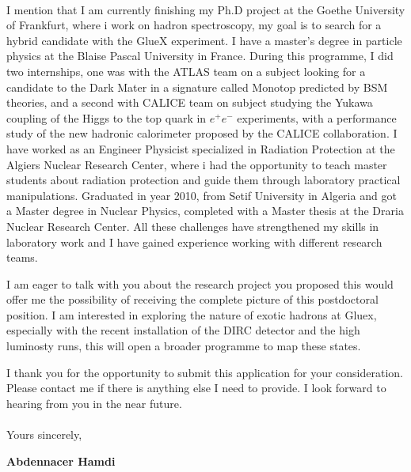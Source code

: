 \documentclass[11pt]{letter}
\begin{document}
~\par I mention that I am currently finishing my Ph.D project at the Goethe University of Frankfurt, where i work on hadron spectroscopy, my goal is to search for a hybrid candidate with the GlueX experiment. I have a master's degree in particle physics at the Blaise Pascal University in France. During this programme, I did two internships, one was with the ATLAS team on a subject looking for a candidate to the Dark Mater in a signature called Monotop predicted by BSM theories, and a second with CALICE team on subject studying the Yukawa coupling of the Higgs to the top quark in $e^{+}e^{-}$ experiments, with a performance study of the new hadronic calorimeter proposed by the CALICE collaboration. I have worked as an Engineer Physicist specialized in Radiation Protection at the Algiers Nuclear Research Center, where i had the opportunity to teach master students about radiation protection and guide them through laboratory practical manipulations. Graduated in year 2010, from Setif University in Algeria and got a Master degree in Nuclear Physics, completed with a Master thesis at the Draria Nuclear Research Center. All these challenges have strengthened my skills in laboratory work and I have gained experience working with different research teams.
~\par I am eager to talk with you about the research project you proposed this would offer me the possibility of receiving the complete picture of this postdoctoral position. I am interested in exploring the nature of exotic hadrons at Gluex, especially with the recent installation of the DIRC detector and the high luminosty runs, this will open a broader programme to map these states. 
~\par I thank you for the opportunity to submit this application for your consideration. Please contact me if there is anything else I need to provide. I look forward to hearing from you in the near future.\\ \\ %
Yours sincerely,

\begin{flushleft}
 {\bfseries Abdennacer Hamdi}
 \end{flushleft}
 \vfill
 
\end{document}
